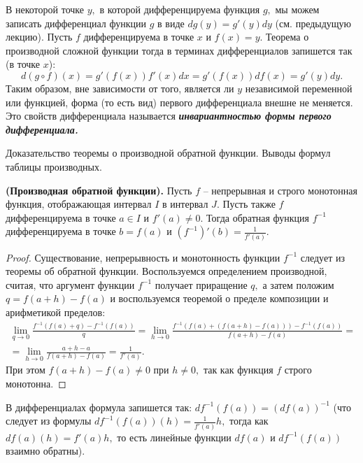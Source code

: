 В некоторой точке $y,$ в которой
дифференцируема функция $g,$
мы можем записать дифференциал
функции $g$ в виде $dg(y)=g'(y)dy$
(см. предыдущую лекцию). Пусть
$f$ дифференцируема в точке $x$
и $f(x)=y.$ Теорема
о производной сложной функции тогда
в терминах дифференциалов запишется
так (в точке $x$):
$$
    d(g\circ f)(x)=g'(f(x))f'(x)dx=
    g'(f(x))df(x)=g'(y)dy.
$$
Таким образом, вне зависимости от того, является
ли $y$ независимой переменной или функцией,
форма (то есть вид) первого дифференциала
внешне не меняется. Это свойств
дифференциала называется
\textbf{\emph{инвариантностью формы первого
        дифференциала.}}
\newpage

\begin{problem}
Доказательство теоремы о производной обратной функции. Выводы формул таблицы
производных.
\end{problem}
\begin{proposition}
    \textbf{(Производная обратной функции).}
    Пусть $f$ -- непрерывная и строго монотонная функция,
    отображающая интервал $I$ в интервал $J.$ Пусть также
    $f$ дифференцируема в точке $a\in I$ и $f'(a)\neq0.$
    Тогда обратная функция $f^{-1}$ дифференцируема
    в точке $b=f(a)$ и $(f^{-1})'(b)=\frac{1}{f'(a)}.$
\end{proposition}
\begin{proof}
    Существование, непрерывность и монотонность
    функции $f^{-1}$ следует из теоремы об
    обратной функции.
    Воспользуемся определением производной, считая, что
    аргумент функции $f^{-1}$ получает приращение $q,$
    а затем положим $q=f(a+h)-f(a)$ и воспользуемся
    теоремой о пределе композиции и арифметикой
    пределов:
    \begin{multline*}
        \lim\limits_{q\rightarrow0}
        \frac{f^{-1}(f(a)+q)-f^{-1}(f(a))}{q}=
        \lim\limits_{h\rightarrow0}
        \frac{f^{-1}(f(a)+(f(a+h)-f(a)))-f^{-1}(f(a))}
        {f(a+h)-f(a)}=\\=
        \lim\limits_{h\rightarrow0}
        \frac{a+h-a}
        {f(a+h)-f(a)}=\frac{1}{f'(a)}.
    \end{multline*}
    При этом $f(a+h)-f(a)\neq0$
    при $h\neq0,$ так как функция
    $f$ строго монотонна.
\end{proof}
В дифференциалах формула запишется так:
$df^{-1}(f(a))=(df(a))^{-1}$
(что следует из формулы
$df^{-1}(f(a))(h)=\frac{1}{f'(a)}h,$
тогда как $df(a)(h)=f'(a)h,$
то есть линейные функции
$df(a)$ и $df^{-1}(f(a))$
взаимно обратны).
